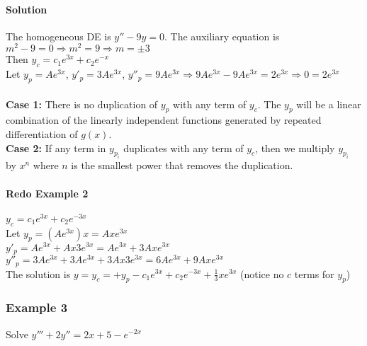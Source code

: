 \documentclass{article}
\begin{document}
\paragraph{Solution} The homogeneous DE is $y''-9y=0$. The auxiliary equation is $m^2-9=0\Rightarrow m^2=9\Rightarrow m=\pm3$
\\Then $y_c=c_1e^{3x}+c_2e^{-x}$
\\Let $y_p=Ae^{3x}$, $y'_p=3Ae^{3x}$, $y''_p=9Ae^{3x}\Rightarrow 9Ae^{3x}-9Ae^{3x}=2e^{3x}\Rightarrow0=2e^{3x}$
\\\\\textbf{Case 1:} There is no duplication of $y_p$ with any term of $y_c$.
The $y_p$ will be a linear combination of the linearly independent functions generated by repeated differentiation of $g(x)$.
\\\textbf{Case 2:} If any term in $y_{p_i}$ duplicates with any term of $y_c$, then we multiply $y_{p_i}$
by $x^n$ where $n$ is the smallest power that removes the duplication.

\paragraph{Redo Example 2} $y_c=c_1e^{3x}+c_2e^{-3x}$
\\Let $y_p=(Ae^{3x})x=Axe^{3x}$
\\$y'_p=Ae^{3x}+Ax3e^{3x}=Ae^{3x}+3Axe^{3x}$\qquad$y''_p=3Ae^{3x}+3Ae^{3x}+3Ax3e^{3x}=6Ae^{3x}+9Axe^{3x}$
\\The solution is $y=y_c=+y_p-c_1e^{3x}+c_2e^{-3x}+\frac{1}{3}xe^{3x}$ (notice no $c$ terms for $y_p$)

\subsubsection{Example 3}
Solve $y'''+2y''=2x+5-e^{-2x}$
\end{document}
